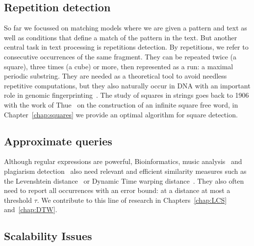 \subsection{Repetition detection}
So far we focussed on matching models where we are given a pattern and text as well as conditions that define a match of the pattern in the text. But another central task in text processing is repetitions detection. By repetitions, we refer to consecutive occurrences of the same fragment. They can be repeated twice (a square), three times (a cube) or more, then represented as a run: a maximal periodic substring. They are needed as a theoretical tool to avoid needless repetitive computations, but they also naturally occur in DNA with an important role in genomic fingerprinting~\cite{Kolpakov2003}.
The study of squares in strings goes back to 1906 with the work of Thue~\cite{thue1906} on the construction of an infinite square free word, in Chapter~\ref{chap:squares} we provide an optimal algorithm for square detection.


\subsection{Approximate queries}
Although regular expressions are powerful, Bioinformatics\cite{Gusfield1997}, music analysis~\cite{mongeau1990comparison} and plagiarism detection~\cite{lukashenko2007computer} also need relevant and efficient similarity measures such as the Levenshtein distance~\cite{levenshtein1966binary} or Dynamic Time warping distance~\cite{sakoe1978dynamic}. They also often need to report all occurrences with an error bound\cite{landau1986efficient,landau1989fast}: at a distance at most a threshold $\tau$.
We contribute to this line of research in Chapters~\ref{chap:LCS} and~\ref{chap:DTW}.


\subsection{Scalability Issues}

 
